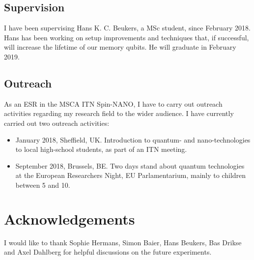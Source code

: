 \documentclass[a4paper]{article}
\begin{document}
\subsection{Supervision}
I have been supervising Hans K. C. Beukers, a MSc student, since February 2018. Hans has been working on setup improvements and techniques that, if successful, will increase the lifetime of our memory qubits. He will graduate in February 2019.

\subsection{Outreach}
As an \ac{ESR} in the \ac{MSCA} \ac{ITN} Spin-NANO, I have to carry out outreach activities regarding my research field to the wider audience. I have currently carried out two outreach activities:
\begin{itemize}
	\item January 2018, Sheffield, UK. Introduction to quantum- and nano-technologies to local high-school students, as part of an \ac{ITN} meeting.
	\item September 2018, Brussels, BE. Two days stand about quantum technologies at the European Researchers Night, EU Parlamentarium, mainly to children between 5 and 10.
\end{itemize}

\section*{Acknowledgements}
I would like to thank Sophie Hermans, Simon Baier, Hans Beukers, Bas Drikse and Axel Dahlberg for helpful discussions on the future experiments.

%

\printbibliography[heading=bibintoc]
\end{document}
